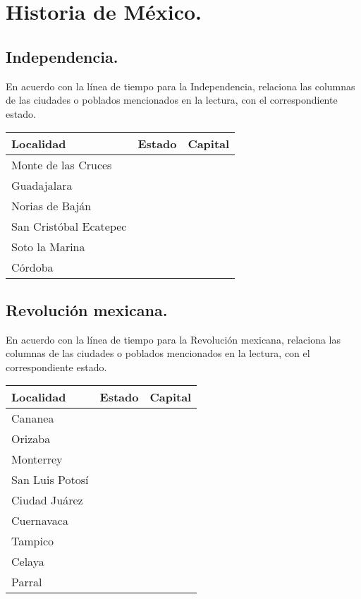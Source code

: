 \documentclass[12pt]{exam}
\begin{document}
\section{Historia de México.}

\subsection{Independencia.}

En acuerdo con la línea de tiempo para la Independencia, relaciona las columnas de las ciudades o poblados mencionados en la lectura, con el correspondiente estado.
\begin{table}[H]
    \centering
    \renewcommand{\arraystretch}{1.2}
    \begin{tabular}{| l | p{5cm} | p{5cm} | } \hline
        \textbf{Localidad} & \multicolumn{1}{c|}{\textbf{Estado}} & \multicolumn{1}{c|}{\textbf{Capital}} \\ \hline
        Monte de las Cruces & & \\ \hline
        Guadajalara & & \\ \hline
        Norias de Baján & & \\ \hline
        San Cristóbal Ecatepec & & \\ \hline
        Soto la Marina & & \\ \hline
        Córdoba & & \\ \hline
    \end{tabular}
\end{table}

\subsection{Revolución mexicana.}

En acuerdo con la línea de tiempo para la Revolución mexicana, relaciona las columnas de las ciudades o poblados mencionados en la lectura, con el correspondiente estado.
\begin{table}[H]
    \centering
    \renewcommand{\arraystretch}{1.2}
    \begin{tabular}{| l | p{5cm} | p{5cm} | } \hline
        \textbf{Localidad} & \multicolumn{1}{c|}{\textbf{Estado}} & \multicolumn{1}{c|}{\textbf{Capital}} \\ \hline
        Cananea & & \\ \hline
        Orizaba & & \\ \hline
        Monterrey & & \\ \hline
        San Luis Potosí & & \\ \hline
        Ciudad Juárez & & \\ \hline
        Cuernavaca & & \\ \hline
        Tampico & & \\ \hline
        Celaya & & \\ \hline
        Parral & & \\ \hline
    \end{tabular}
\end{table}
\end{document}
